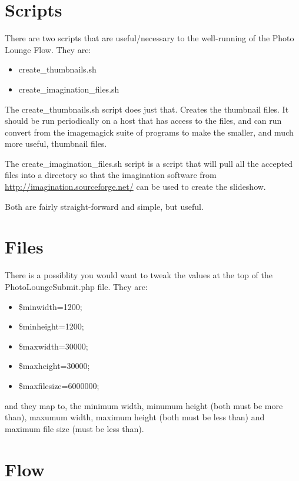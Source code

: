 \documentclass[captions=tablesignature]{scrartcl}
\begin{document}
\section{Scripts}
\label{sec-3}

There are two scripts that are useful/necessary to the well-running
of the Photo Lounge Flow.  They are:
\begin{itemize}
\item create\_thumbnails.sh
\item create\_imagination\_files.sh
\end{itemize}

The create\_thumbnails.sh script does just that.  Creates the
thumbnail files.  It should be run periodically on a host that has
access to the files, and can run convert from the imagemagick suite
of programs to make the smaller, and much more useful, thumbnail
files.

The create\_imagination\_files.sh script is a script that will pull
all the accepted files into a directory so that the imagination
software from \url{http://imagination.sourceforge.net/} can be used to
create the slideshow.

Both are fairly straight-forward and simple, but useful.

\section{Files}
\label{sec-4}

There is a possiblity you would want to tweak the values at the top
of the PhotoLoungeSubmit.php file.  They are:
\begin{itemize}
\item \$minwidth=1200;
\item \$minheight=1200;
\item \$maxwidth=30000;
\item \$maxheight=30000;
\item \$maxfilesize=6000000;
\end{itemize}

and they map to, the minimum width, minumum height (both must
be more than), maxumum width, maximum height (both must be less
than) and maximum file size (must be less than).

\section{Flow}
\label{sec-5}
\end{document}
